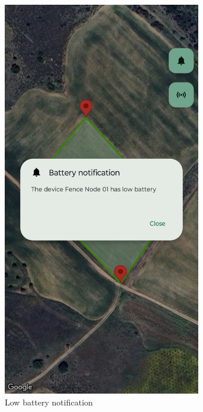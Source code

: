 \begin{enumerate}
\begin{figure}[H]
\begin{subfigure}[t]{0.3\textwidth}
                \centering
                \includegraphics[width=0.95\textwidth]{images/8/13.png}
                \caption{Low battery notification}
            \end{subfigure}
            \begin{subfigure}[t]{0.3\textwidth}
                \centering

\end{subfigure}
\end{figure}
\end{enumerate}
